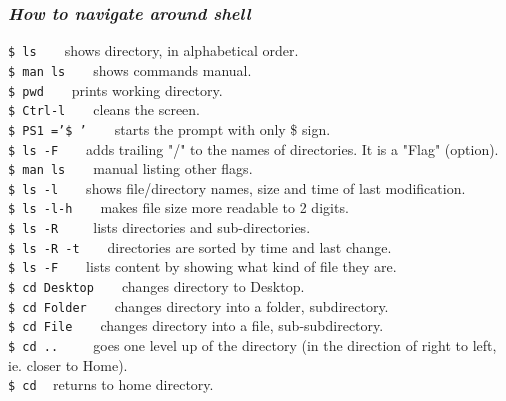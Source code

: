 \documentclass{article}
\begin{document}
\subsubsection{\small\textsl{How to navigate around shell}}
\texttt{\$ ls} ~ ~ shows directory, in alphabetical order.\\ 
\texttt{\$ man ls} ~ ~ shows commands manual.\\ 
\texttt{\$ pwd} ~ ~ prints working directory.\\
\texttt{\$ Ctrl-l} ~ ~ cleans the screen.\\ 
\texttt{\$ PS1 ='\$ '} ~ ~ starts the prompt with only \$ sign.\\  
\texttt{\$ ls -F} ~ ~ adds trailing "/" to the names of directories. It is a "Flag" (option).\\ 
\texttt{\$ man ls} ~ ~ manual listing other flags.\\ 
\texttt{\$ ls -l} ~ ~ shows file/directory names, size and time of last modification.\\ 
\texttt{\$ ls -l-h} ~ ~ makes file size more readable to 2 digits.\\ 
\texttt{\$ ls -R	} ~ ~ lists directories and sub-directories.\\ 
\texttt{\$ ls -R -t} ~ ~ directories are sorted by time and last change.\\ 
\texttt{\$ ls -F} ~ ~ lists content by showing what kind of file they are.\\
\texttt{\$ cd Desktop} ~ ~ changes directory to Desktop.\\
\texttt{\$ cd Folder} ~ ~ changes directory into a folder, subdirectory. \\
\texttt{\$ cd File} ~ ~ changes directory into a file, sub-subdirectory. \\
\texttt{\$ cd ..	} ~ ~ goes one level up of the directory (in the direction of right to left, ie. closer to Home).\\
\texttt{\$ cd} ~ returns to home directory. 
\end{document}
